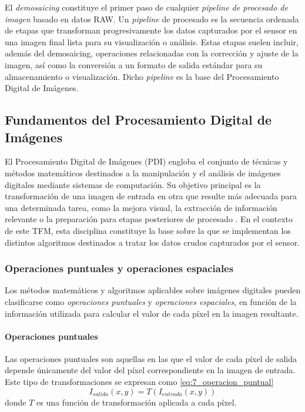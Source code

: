 El \textit{demosaicing} constituye el primer paso de cualquier \textit{pipeline de procesado de
imagen} basado en datos RAW. Un \textit{pipeline} de procesado es la secuencia ordenada
de etapas que transforman progresivamente los datos capturados por el sensor en una imagen final
lista para su visualización o análisis. Estas etapas suelen incluir, además del demosaicing,
operaciones relacionadas con la corrección y ajuste de la imagen, así como la conversión 
a un formato de salida estándar para su almacenamiento o visualización. Dicho \textit{pipeline}
es la base del Procesamiento Digital de Imágenes.

\newpage

\subsection{Fundamentos del Procesamiento Digital de Imágenes} \label{subsec:3_5_fundamentos_procesamiento_digital_imagenes}
El Procesamiento Digital de Imágenes (PDI) engloba el conjunto de técnicas y métodos matemáticos
destinados a la manipulación y el análisis de imágenes digitales mediante sistemas de computación.
Su objetivo principal es la transformación de una imagen de entrada en otra que resulte más adecuada 
para una determinada tarea, como la mejora visual, la extracción de información relevante o 
la preparación para etapas posteriores de procesado \cite{fundamentals_digital_image_processing}.
En el contexto de este TFM, esta disciplina constituye la base sobre la que se implementan los distintos 
algoritmos destinados a tratar los datos crudos capturados por el sensor.

\subsubsection{Operaciones puntuales y operaciones espaciales} \label{subsubsec:3_5_1_operaciones_puntuales_espaciales}
Los métodos matemáticos y algoritmos aplicables sobre imágenes digitales pueden clasificarse como 
\textit{operaciones puntuales} y \textit{operaciones espaciales}, en función de la información 
utilizada para calcular el valor de cada píxel en la imagen resultante.

\paragraph{Operaciones puntuales} \label{subsubsubsec:3_5_1_1_operaciones_puntuales}
Las operaciones puntuales son aquellas en las que el valor de cada píxel 
de salida depende únicamente del valor del píxel correspondiente en la imagen de entrada.
Este tipo de transformaciones se expresan como \eqref{eq:7_operacion_puntual}
\begin{equation}
    I_{salida}(x,y) = T(I_{entrada}(x,y))
    \label{eq:7_operacion_puntual}
\end{equation}
donde \(T\) es una función de transformación aplicada a cada píxel.

